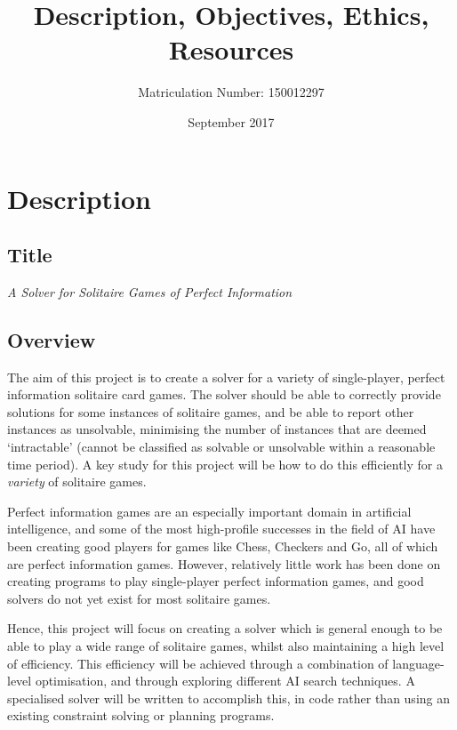 \documentclass{article}
\title{Description, Objectives, Ethics, Resources}
\author{Matriculation Number: 150012297}
\date{September 2017}
\begin{document}
\maketitle

\section{Description}

\subsection{Title}

\vspace{2mm}

\emph{\large{A Solver for Solitaire Games of Perfect Information}}

\subsection{Overview}

The aim of this project is to create a  solver for a variety of single-player,
perfect information solitaire card games. The solver should be able to
correctly provide solutions for some instances of solitaire games, and be able
to report other instances as unsolvable, minimising the number of instances
that are deemed `intractable' (cannot be classified as solvable or unsolvable
within a reasonable time period). A key study for this project will be how to
do this efficiently for a \emph{variety} of solitaire games.

Perfect information games are an especially important domain in artificial
intelligence, and some of the most high-profile successes in the field of AI
have been creating good players for games like Chess, Checkers and Go, all of
which are perfect information games. However, relatively little work has been
done on creating programs to play single-player perfect information games, and
good solvers do not yet exist for most solitaire games.

Hence, this project will focus on creating a solver which is general enough to
be able to play a wide range of solitaire games, whilst also maintaining a high
level of efficiency. This efficiency will be achieved through a combination of
language-level optimisation, and through exploring different AI search
techniques. A specialised solver will be written to accomplish this, in code
rather than using an existing constraint solving or planning programs.
\end{document}
